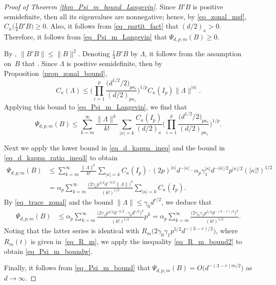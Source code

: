 \documentclass[pdftex]{sigma}
\numberwithin{equation}{section}
\begin{document}
\begin{proof}[Proof of Theorem \ref{thm_Psi_m_bound_Langevin}]
Since $B'B$ is positive semidefinite, then all its eigenvalues are nonnegative; hence, by \eqref{eq_zonal_msf}, $C_\kappa\bigl(\frac14 B'B\bigr) \ge 0$. Also, it follows from \eqref{eq_partit_fact} that $(d/2)_\kappa > 0$. Therefore, it follows from \eqref{eq_Psi_m_Langevin} that $\Psi_{d,p;m}(B) \ge 0$.

By \cite[Section 5.6]{Horn}, $\|B'B\| \le \|B\|^2$. Denoting $\tfrac14 B'B$ by $\Lambda$, it follows from the assumption on~$B$ that
.
Since $\Lambda$ is positive semidefinite, then by Proposition~\ref{prop_zonal_bound},
\[
C_\kappa(\Lambda) \le \Bigg(\prod_{i=1}^p \frac{\bigl(d^{1/2}/2\bigr)_{p \kappa_i}}{(d/2)_{p \kappa_i}}\Bigg)^{1/p} C_\kappa(I_p) \|\Lambda\|^{|\kappa|}.
\]
Applying this bound to \eqref{eq_Psi_m_Langevin}, we find that
\[
\Psi_{d,p;m}(B) \le \sum_{k=m}^\infty \frac{\|\Lambda\|^k}{k!} \sum_{|\kappa|=k} \frac{C_\kappa(I_p)}{(d/2)_\kappa} \Bigg(\prod_{i=1}^p \frac{\bigl(d^{1/2}/2\bigr)_{p \kappa_i}}{(d/2)_{p \kappa_i}}\Bigg)^{1/p}.
\]

Next we apply the lower bound in \eqref{eq_d_kappa_ineq} and the bound in \eqref{eq_d_kappa_ratio_ineq3} to obtain
\begin{align*}
\Psi_{d,p;m}(B) &\le \sum_{k=m}^\infty \frac{\|\Lambda\|^k}{k!} \sum_{|\kappa|=k} C_\kappa(I_p) \cdot (2p)^{|\kappa|} d^{-|\kappa|} \cdot \alpha_p \gamma_1^{|\kappa|} d^{-|\kappa|/2} p^{|\kappa|/2} (|\kappa|!)^{1/2} \\
&= \alpha_p \sum_{k=m}^\infty \frac{\bigl(2 \gamma_1 p^{3/2} d^{-3/2} \|\Lambda\|\bigr)^k}{(k!)^{1/2}} \sum_{|\kappa|=k} C_\kappa(I_p).
\end{align*}
By \eqref{eq_trace_zonal} and the bound $\|\Lambda\| \le \gamma_0 d^{r/2}$, we deduce that
\begin{align*}
\Psi_{d,p;m}(B) &\le \alpha_p \sum_{k=m}^\infty \frac{\bigl(2 \gamma_1 p^{3/2} d^{-3/2} \cdot \gamma_0 d^{r/2}\bigr)^k}{(k!)^{1/2}} p^k = \alpha_p \sum_{k=m}^\infty \frac{\bigl(2 \gamma_0 \gamma_1 p^{5/2} d^{-(3-r)/2}\bigr)^k}{(k!)^{1/2}}.
\end{align*}
Noting that the latter series is identical with $R_m\bigl(2 \gamma_0 \gamma_1 p^{5/2} d^{-(3-r)/2}\bigr)$, where $R_m(t)$ is given in~\eqref{eq_R_m}, we apply the inequality \eqref{eq_R_m_bound2} to obtain \eqref{eq_Psi_m_boundw}.

Finally, it follows from \eqref{eq_Psi_m_bound} that $\Psi_{d,p;m}(B) = O\bigl(d^{-(3-r)m/2}\bigr)$ as $d \to \infty$.
\end{proof}
\end{document}
